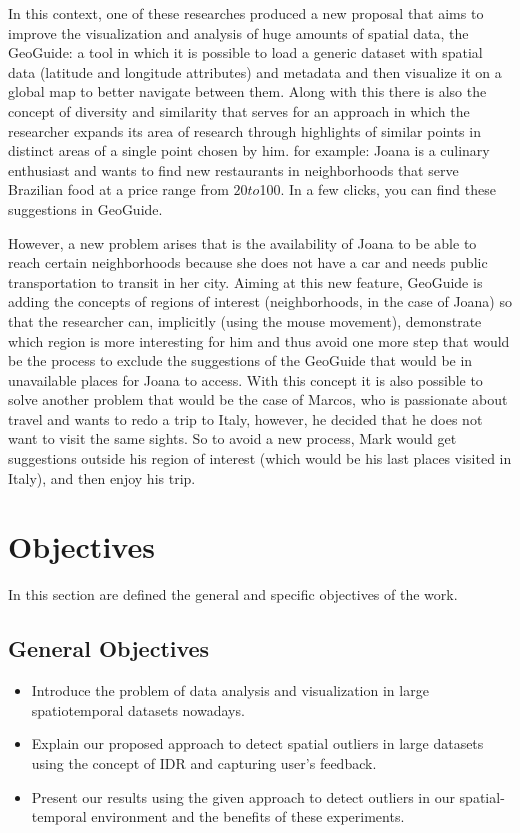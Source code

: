 In this context, one of these researches produced a new proposal that aims to
improve the visualization and analysis of huge amounts of spatial data, the
GeoGuide: a tool in which it is possible to load a generic dataset with spatial
data (latitude and longitude attributes) and metadata and then visualize it on a
global map to better navigate between them. Along with this there is also the
concept of diversity and similarity that serves for an approach in which the
researcher expands its area of research through highlights of similar points in
distinct areas of a single point chosen by him. for example: Joana is a culinary
enthusiast and wants to find new restaurants in neighborhoods that serve Brazilian
food at a price range from $20 to $100. In a few clicks, you can find these
suggestions in GeoGuide.

However, a new problem arises that is the availability of Joana to be able to
reach certain neighborhoods because she does not have a car and needs public
transportation to transit in her city. Aiming at this new feature, GeoGuide is
adding the concepts of regions of interest (neighborhoods, in the case of Joana)
so that the researcher can, implicitly (using the mouse movement), demonstrate
which region is more interesting for him and thus avoid one more step that would
be the process to exclude the suggestions of the GeoGuide that would be in unavailable
places for Joana to access. With this concept it is also possible to solve another
problem that would be the case of Marcos, who is passionate about travel and wants
to redo a trip to Italy, however, he decided that he does not want to visit the
same sights. So to avoid a new process, Mark would get suggestions outside his
region of interest (which would be his last places visited in Italy), and then
enjoy his trip.


\section{Objectives}

In this section are defined the general and specific objectives of the work.

\subsection{General Objectives}

\begin{itemize}
	\item
	      Introduce the problem of data analysis and visualization in large spatiotemporal
	      datasets nowadays.
	\item
	      Explain our proposed approach to detect spatial outliers in large datasets using
	      the concept of IDR and capturing user's feedback.
	\item
	      Present our results using the given approach to detect outliers in our spatial-temporal
	      environment and the benefits of these experiments.

\end{itemize}


